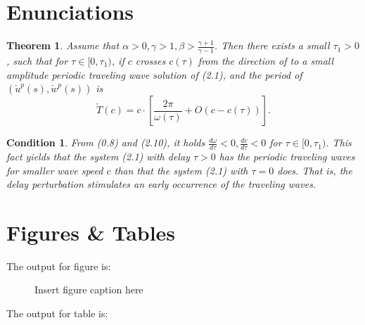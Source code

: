 \documentclass[openacc]{rstransa}%
\newtheorem{theorem}{\bf Theorem}[section]
\newtheorem{condition}{\bf Condition}[section]
\begin{document}

\maketitle

\section{Enunciations}

\begin{theorem}\label{T0.1}
Assume that $\alpha>0, \gamma>1, \beta>\frac{\gamma+1}{\gamma-1}$.
Then there exists a small $\tau_1>0$, such that for $\tau\in
[0,\tau_1)$, if $c$ crosses $c(\tau)$ from the direction of
to  a small amplitude periodic traveling wave solution of
(2.1), and the period of $(\check{u}^p(s),\check{w}^p(s))$ is
\[
\check{T}(c)=c\cdot \left[\frac{2\pi}{\omega(\tau)}+O(c-c(\tau))\right].
\]
\end{theorem}


\begin{condition}\label{C2.2}
From (0.8) and (2.10), it holds
$\frac{d\omega}{d\tau}<0,\frac{dc}{d\tau}<0$ for $\tau\in
[0,\tau_1)$. This fact yields that the system (2.1) with delay
$\tau>0$ has the periodic traveling waves for smaller wave speed $c$
than that the system (2.1) with $\tau=0$ does. That is, the
delay perturbation stimulates an early occurrence of the traveling waves.
\end{condition}


\section{Figures \& Tables}

The output for figure is:\vspace*{-7pt}

\begin{figure}[!h]
\caption{Insert figure caption here}
\label{fig_sim}
\end{figure}

\vspace*{-5pt}

\noindent The output for table is:\vspace*{-7pt}
\end{document}
